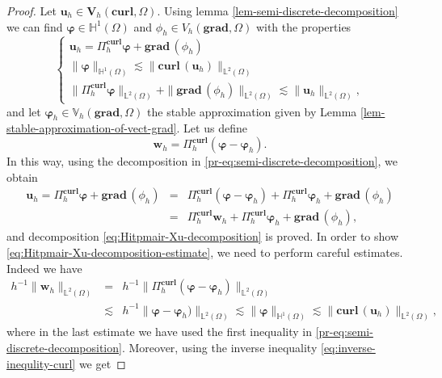 \begin{proof}
Let $\bm{u}_h \in \bm{V}_h(\textbf{curl},\Omega)$. Using lemma \eqref{lem-semi-discrete-decomposition} we can find 
$\bm{\varphi} \in \mathbb{H}^1(\Omega)$ and $\phi_h \in V_h(\textbf{grad},\Omega)$ with the properties
\begin{equation}\label{pr-eq:semi-discrete-decomposition}
\begin{cases}
\bm{u}_h = \Pi_h^{\textbf{curl}} \bm{\varphi} + \textbf{grad}\,(\phi_h)\\
\|\bm{\varphi}\|_{\mathbb{H}^1(\Omega)} \lesssim \|\textbf{curl} \,(\bm{u}_h)\|_{\mathbb{L}^2(\Omega)}\\
\|\Pi_h^{\textbf{curl}} \bm{\varphi}\|_{\mathbb{L}^2(\Omega)} + \|\textbf{grad}\,(\phi_h)\|_{\mathbb{L}^2(\Omega)}\lesssim \|\bm{u}_h\|_{\mathbb{L}^2(\Omega)},
\end{cases}
\end{equation}
and let $\bm{\varphi}_h \in \mathbb{V}_h(\textbf{grad},\Omega)$ the stable approximation given by Lemma \ref{lem-stable-approximation-of-vect-grad}. Let us define
$$
\bm{w}_h=\Pi_h^{\textbf{curl}} (\bm{\varphi}-\bm{\varphi}_h).
$$
In this way, using the decomposition in \eqref{pr-eq:semi-discrete-decomposition}, we obtain
\begin{eqnarray*}
\bm{u}_h = \Pi_h^{\textbf{curl}} \bm{\varphi} + \textbf{grad}\,(\phi_h)&=&\Pi_h^{\textbf{curl}} (\bm{\varphi}-\bm{\varphi}_h)+ \Pi_h^{\textbf{curl}} \bm{\varphi}_h+ \textbf{grad}\,(\phi_h)\\
&=& \Pi_h^{\textbf{curl}} \bm{w}_h+ \Pi_h^{\textbf{curl}} \bm{\varphi}_h+ \textbf{grad}\,(\phi_h),
\end{eqnarray*}
and decomposition \eqref{eq:Hitpmair-Xu-decomposition} is proved. In order to show \eqref{eq:Hitpmair-Xu-decomposition-estimate}, we need to perform careful estimates. Indeed we have
\begin{eqnarray}\label{pr-eq:semi-discrete-decomposition-1}
h^{-1} \|\bm{w}_h\|_{\mathbb{L}^2(\Omega)} &=& h^{-1} \|\Pi_h^{\textbf{curl}} (\bm{\varphi}-\bm{\varphi}_h)\|_{\mathbb{L}^2(\Omega)}  \nonumber \\ 
& \lesssim & h^{-1}  \|\bm{\varphi}-\bm{\varphi}_h)\|_{\mathbb{L}^2(\Omega)}
 \lesssim  \|\bm{\varphi}\|_{\mathbb{H}^1(\Omega)} \lesssim \|\textbf{curl} \,(\bm{u}_h)\|_{\mathbb{L}^2(\Omega)},
\end{eqnarray}
where in the last estimate we have used the first inequality in \eqref{pr-eq:semi-discrete-decomposition}. Moreover, using the inverse inequality \eqref{eq:inverse-inequlity-curl} we get

\end{proof}
